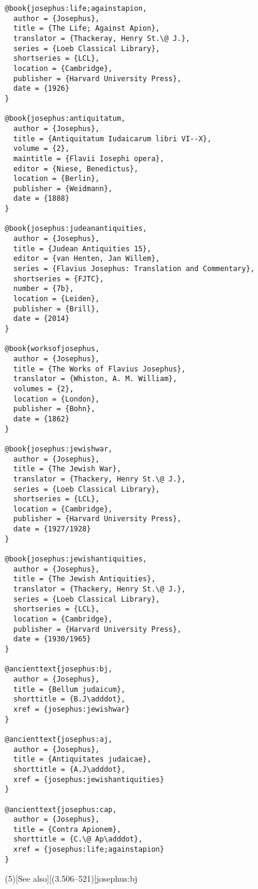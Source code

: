 \documentclass[a4paper]{article}
\renewcommand\footnote[1]{##1}%
\begin{document}
\begin{verbatim}
@book{josephus:life;againstapion,
  author = {Josephus},
  title = {The Life; Against Apion},
  translator = {Thackeray, Henry St.\@ J.},
  series = {Loeb Classical Library},
  shortseries = {LCL},
  location = {Cambridge},
  publisher = {Harvard University Press},
  date = {1926}
}

@book{josephus:antiquitatum,
  author = {Josephus},
  title = {Antiquitatum Iudaicarum libri VI--X},
  volume = {2},
  maintitle = {Flavii Iosephi opera},
  editor = {Niese, Benedictus},
  location = {Berlin},
  publisher = {Weidmann},
  date = {1888}
}

@book{josephus:judeanantiquities,
  author = {Josephus},
  title = {Judean Antiquities 15},
  editor = {van Henten, Jan Willem},
  series = {Flavius Josephus: Translation and Commentary},
  shortseries = {FJTC},
  number = {7b},
  location = {Leiden},
  publisher = {Brill},
  date = {2014}
}

@book{worksofjosephus,
  author = {Josephus},
  title = {The Works of Flavius Josephus},
  translator = {Whiston, A. M. William},
  volumes = {2},
  location = {London},
  publisher = {Bohn},
  date = {1862}
}

@book{josephus:jewishwar,
  author = {Josephus},
  title = {The Jewish War},
  translator = {Thackery, Henry St.\@ J.},
  series = {Loeb Classical Library},
  shortseries = {LCL},
  location = {Cambridge},
  publisher = {Harvard University Press},
  date = {1927/1928}
}

@book{josephus:jewishantiquities,
  author = {Josephus},
  title = {The Jewish Antiquities},
  translator = {Thackery, Henry St.\@ J.},
  series = {Loeb Classical Library},
  shortseries = {LCL},
  location = {Cambridge},
  publisher = {Harvard University Press},
  date = {1930/1965}
}

@ancienttext{josephus:bj,
  author = {Josephus},
  title = {Bellum judaicum},
  shorttitle = {B.J\adddot},
  xref = {josephus:jewishwar}
}

@ancienttext{josephus:aj,
  author = {Josephus},
  title = {Antiquitates judaicae},
  shorttitle = {A.J\adddot},
  xref = {josephus:jewishantiquities}
}

@ancienttext{josephus:cap,
  author = {Josephus},
  title = {Contra Apionem},
  shorttitle = {C.\@ Ap\adddot},
  xref = {josephus:life;againstapion}
}
\end{verbatim}

\examplecite[atrans](5)[See also][(3.506–521)]{josephus:bj}
\exampleancientsources
\examplesecondarysources
\examplebibliography
\end{document}
